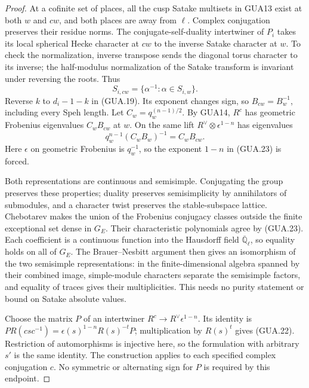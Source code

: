 \documentclass[11pt,a4paper]{article}
\numberwithin{equation}{section}
\theoremstyle{remark}\newtheorem{remark}[theorem]{Remark}
\begin{document}
\begin{proof}
At a cofinite set of places, all the cusp Satake
multisets in GUA13 exist at both $w$ and $cw$, and
both places are away from $\ell$.  Complex
conjugation preserves their residue norms.  The
conjugate-self-duality intertwiner of $P_i$ takes
its local spherical Hecke character at $cw$ to the
inverse Satake character at $w$.  To check the
normalization, inverse transpose sends the diagonal
torus character to its inverse; the half-modulus
normalization of the Satake transform is invariant
under reversing the roots.  Thus
\[
                 S_{i,cw}=\{\alpha^{-1}:\alpha\in S_{i,w}\}.
\]
Reverse $k$ to $d_i-1-k$ in (GUA.19).  Its exponent
changes sign, so $B_{cw}=B_w^{-1}$, including every
Speh length.  Let $C_w=q_w^{(n-1)/2}$.
By GUA14, $R^c$ has geometric Frobenius eigenvalues
$C_wB_{cw}$ at $w$.  On the same lift
$R^\vee\otimes\epsilon^{1-n}$ has eigenvalues
\[
         q_w^{n-1}(C_wB_w)^{-1}
                  =C_wB_{cw}.                         \tag{GUA.23}
\]
Here $\epsilon$ on geometric Frobenius is $q_w^{-1}$,
so the exponent $1-n$ in (GUA.23) is forced.

Both representations are continuous and semisimple.
Conjugating the group preserves these properties;
duality preserves semisimplicity by annihilators
of submodules, and a character twist preserves
the stable-subspace lattice.  Chebotarev makes
the union of the Frobenius conjugacy classes
outside the finite exceptional set dense in $G_E$.
Their characteristic polynomials agree by (GUA.23).
Each coefficient is a continuous function into
the Hausdorff field $\overline{\mathbb Q}_\ell$,
so equality holds on all of $G_E$.  The
Brauer--Nesbitt argument then gives an isomorphism
of the two semisimple representations: in the
finite-dimensional algebra spanned by their
combined image, simple-module characters separate
the semisimple factors, and equality of traces
gives their multiplicities.  This needs no purity
statement or bound on Satake absolute values.

Choose the matrix $P$ of an intertwiner
$R^c\longrightarrow R^\vee\epsilon^{1-n}$.
Its identity is
$P R(csc^{-1})=\epsilon(s)^{1-n}R(s)^{-t}P$;
multiplication by $R(s)^t$ gives (GUA.22).
Restriction of automorphisms is injective here,
so the formulation with arbitrary $s'$ is the
same identity.  The construction applies to each
specified complex conjugation $c$.  No symmetric
or alternating sign for $P$ is required by this endpoint.
\end{proof}
\end{document}
